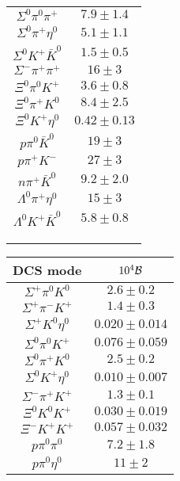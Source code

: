 \begin{table}
{\begin{tabular}{|c|c|}
			$ \Sigma^{0} \pi^{0} \pi^{+} $ & $    7.9 \pm    1.4 $ \\
			$ \Sigma^{0} \pi^{+} \eta^{0} $ & $    5.1 \pm    1.1 $ \\
			$ \Sigma^{0} K^{+} \bar{K}^{0} $ & $    1.5 \pm     0.5 $ \\
			$\Sigma^{-} \pi^{+} \pi^{+} $ & $   16 \pm    3 $ \\
			$ \Xi^{0} \pi^{0} K^{+} $ & $    3.6 \pm     0.8 $ \\
			$ \Xi^{0} \pi^{+} K^{0}$ & $    8.4 \pm    2.5 $ \\
			$ \Xi^{0} K^{+} \eta^{0} $ & $     0.42 \pm     0.13 $ \\
			$p \pi^{0} \bar{K}^{0} $ & $   19 \pm    3 $ \\
			$p \pi^{+} K^{-} $ & $   27 \pm    3 $ \\
			$ n \pi^{+} \bar{K}^{0} $ & $    9.2 \pm    2.0 $ \\
			$\Lambda^{0} \pi^{+} \eta^{0} $ & $   15 \pm    3 $ \\
			$ \Lambda^{0} K^{+} \bar{K}^{0} $ & $    5.8 \pm     0.8 $ \\
			&\\
			&\\
			&\\
			\hline
		\end{tabular}
		\begin{tabular}{|c|c|}
			\hline
			DCS mode& $10^{4}{\cal B}$\\
			\hline
			$ \Sigma^{+} \pi^{0} K^{0} $ & $     2.6 \pm      0.2 $ \\
			$ \Sigma^{+} \pi^{-} K^{+}  $ & $     1.4 \pm      0.3 $ \\
			$ \Sigma^{+} K^{0} \eta^{0}  $ & $      0.020 \pm      0.014 $ \\
			$ \Sigma^{0} \pi^{0} K^{+}  $ & $      0.076 \pm      0.059 $ \\
			$ \Sigma^{0} \pi^{+} K^{0}  $ & $     2.5 \pm      0.2 $ \\
			$ \Sigma^{0} K^{+} \eta^{0}  $ & $      0.010 \pm      0.007 $ \\
			$ \Sigma^{-} \pi^{+} K^{+}  $ & $      1.3 \pm       0.1 $ \\
			$ \Xi^{0} K^{0} K^{+}  $ & $      0.030 \pm       0.019 $ \\
			$ \Xi^{-} K^{+} K^{+}  $ & $      0.057 \pm      0.032 $ \\
			$ p \pi^{0} \pi^{0}  $ & $      7.2 \pm      1.8 $ \\
			$ p \pi^{0} \eta^{0}  $ & $      11 \pm      2 $ \\

\end{tabular}}
\end{table}
